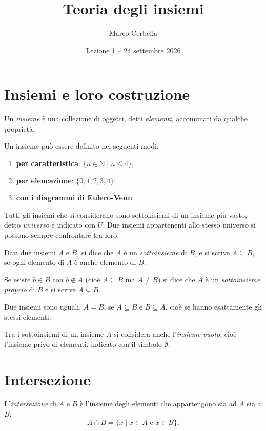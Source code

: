 \documentclass[11pt,a4paper]{article}
\title{Teoria degli insiemi}
\author{Marco Cerbella}
\date{Lezione 1 -- 24 settembre 2026}
\begin{document}
\maketitle

\section{Insiemi e loro costruzione}

\begin{definizione}
Un \emph{insieme} è una collezione di oggetti, detti \emph{elementi},
accomunati da qualche proprietà.
\end{definizione}

Un insieme può essere definito nei seguenti modi:
\begin{enumerate}
    \item \textbf{per caratteristica}: $\{n \in \mathbb{N} \mid n \leq 4\}$;
    \item \textbf{per elencazione}: $\{0, 1, 2, 3, 4\}$;
    \item \textbf{con i diagrammi di Eulero-Venn}.
\end{enumerate}

Tutti gli insiemi che si considerano sono sottoinsiemi di un insieme più
vasto, detto \emph{universo} e indicato con $U$. Due insiemi appartenenti
allo stesso universo si possono sempre confrontare tra loro.

\begin{definizione}
Dati due insiemi $A$ e $B$, si dice che $A$ è un \emph{sottoinsieme} di $B$,
e si scrive $A \subseteq B$, se ogni elemento di $A$ è anche elemento di $B$.
\end{definizione}

Se esiste $b \in B$ con $b \notin A$ (cioè $A \subseteq B$ ma $A \neq B$) si dice che $A$ è un \emph{sottoinsieme proprio} di $B$ e si scrive $A \subsetneq B$.

Due insiemi sono uguali, $A = B$, se $A \subseteq B$ e $B \subseteq A$,
cioè se hanno esattamente gli stessi elementi.

Tra i sottoinsiemi di un insieme $A$ si considera anche l'\emph{insieme vuoto},
cioè l'insieme privo di elementi, indicato con il simbolo $\emptyset$.

\section{Intersezione}

\begin{definizione}
L'\emph{intersezione} di $A$ e $B$ è l'insieme degli elementi che
appartengono sia ad $A$ sia a $B$:
\[
A \cap B = \{x \mid x \in A \text{ e } x \in B\}.
\]
\end{definizione}
\end{document}
